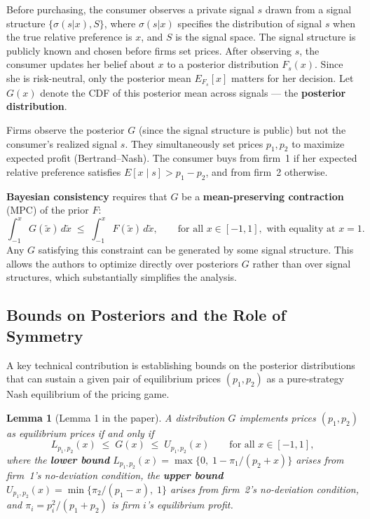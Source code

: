\documentclass[12pt, a4paper]{article}
\newtheorem{lemma}{Lemma}
\begin{document}
Before purchasing, the consumer observes a private signal $s$ drawn from a signal structure $\{\sigma(s|x), S\}$, where $\sigma(s|x)$ specifies the distribution of signal $s$ when the true relative preference is $x$, and $S$ is the signal space. The signal structure is publicly known and chosen before firms set prices. After observing $s$, the consumer updates her belief about $x$ to a posterior distribution $F_s(x)$. Since she is risk-neutral, only the posterior mean $E_{F_s}[x]$ matters for her decision. Let $G(x)$ denote the CDF of this posterior mean across signals --- the \textbf{posterior distribution}.

Firms observe the posterior $G$ (since the signal structure is public) but not the consumer's realized signal $s$. They simultaneously set prices $p_1, p_2$ to maximize expected profit (Bertrand--Nash). The consumer buys from firm~1 if her expected relative preference satisfies $E[x \mid s] > p_1 - p_2$, and from firm~2 otherwise.

\textbf{Bayesian consistency} requires that $G$ be a \textbf{mean-preserving contraction} (MPC) of the prior $F$:
\begin{equation}
    \int_{-1}^{x} G(\tilde{x})\,d\tilde{x} \;\leq\; \int_{-1}^{x} F(\tilde{x})\,d\tilde{x}, \qquad \text{for all } x \in [-1,1], \text{ with equality at } x = 1.
\end{equation}
Any $G$ satisfying this constraint can be generated by some signal structure. This allows the authors to optimize directly over posteriors $G$ rather than over signal structures, which substantially simplifies the analysis.

\subsection{Bounds on Posteriors and the Role of Symmetry}

A key technical contribution is establishing bounds on the posterior distributions that can sustain a given pair of equilibrium prices $(p_1, p_2)$ as a pure-strategy Nash equilibrium of the pricing game.

\begin{lemma}[Lemma 1 in the paper]
A distribution $G$ implements prices $(p_1, p_2)$ as equilibrium prices if and only if
\begin{equation}
    L_{p_1,p_2}(x) \;\leq\; G(x) \;\leq\; U_{p_1,p_2}(x) \qquad \text{for all } x \in [-1,1],
\end{equation}
where the \textbf{lower bound} $L_{p_1,p_2}(x) = \max\{0,\; 1 - \pi_1/(p_2 + x)\}$ arises from firm~1's no-deviation condition, the \textbf{upper bound} $U_{p_1,p_2}(x) = \min\{\pi_2/(p_1 - x),\; 1\}$ arises from firm~2's no-deviation condition, and $\pi_i = p_i^2/(p_1 + p_2)$ is firm $i$'s equilibrium profit.
\end{lemma}
\end{document}
